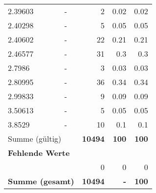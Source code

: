 \begin{longtable}{lXrrr}
        2.39603 & \multicolumn{1}{X}{-} & %
          \num{2} &
          \num[round-mode=places,round-precision=2]{0.02} &
          \num[round-mode=places,round-precision=2]{0.02} \\

        2.40298 & \multicolumn{1}{X}{-} & %
          \num{5} &
          \num[round-mode=places,round-precision=2]{0.05} &
          \num[round-mode=places,round-precision=2]{0.05} \\

        2.40602 & \multicolumn{1}{X}{-} & %
          \num{22} &
          \num[round-mode=places,round-precision=2]{0.21} &
          \num[round-mode=places,round-precision=2]{0.21} \\

        2.46577 & \multicolumn{1}{X}{-} & %
          \num{31} &
          \num[round-mode=places,round-precision=2]{0.3} &
          \num[round-mode=places,round-precision=2]{0.3} \\

        2.7986 & \multicolumn{1}{X}{-} & %
          \num{3} &
          \num[round-mode=places,round-precision=2]{0.03} &
          \num[round-mode=places,round-precision=2]{0.03} \\

        2.80995 & \multicolumn{1}{X}{-} & %
          \num{36} &
          \num[round-mode=places,round-precision=2]{0.34} &
          \num[round-mode=places,round-precision=2]{0.34} \\

        2.99833 & \multicolumn{1}{X}{-} & %
          \num{9} &
          \num[round-mode=places,round-precision=2]{0.09} &
          \num[round-mode=places,round-precision=2]{0.09} \\

        3.50613 & \multicolumn{1}{X}{-} & %
          \num{5} &
          \num[round-mode=places,round-precision=2]{0.05} &
          \num[round-mode=places,round-precision=2]{0.05} \\

        3.8529 & \multicolumn{1}{X}{-} & %
          \num{10} &
          \num[round-mode=places,round-precision=2]{0.1} &
          \num[round-mode=places,round-precision=2]{0.1} \\

     \midrule
     \multicolumn{2}{l}{Summe (gültig)} &
       \textbf{\num{10494}} &
     \textbf{\num{100}} &
       \textbf{\num[round-mode=places,round-precision=2]{100}} \\
     \multicolumn{5}{l}{\textbf{Fehlende Werte}}\\
      & & 0 & 0 & 0 \\
     \midrule
     \multicolumn{2}{l}{\textbf{Summe (gesamt)}} &
          \textbf{\num{10494}} &
        \textbf{-} &
        \textbf{\num{100}} \\
     \bottomrule
     \end{longtable}
     
